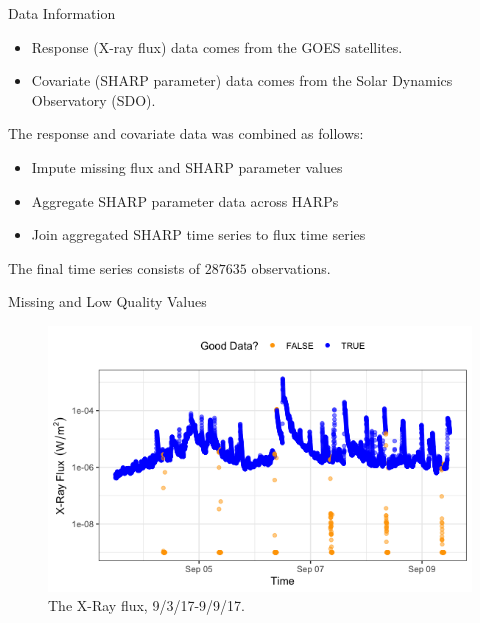\documentclass{beamer}
\begin{document}
\begin{frame}{Data Information}
    \begin{itemize}
        \item Response (X-ray flux) data comes from the GOES satellites.
        \item Covariate (SHARP parameter) data comes from the Solar Dynamics Observatory (SDO).
    \end{itemize}

    The response and covariate data was combined as follows:
    \begin{itemize}
        \item Impute missing flux and SHARP parameter values
        \item Aggregate SHARP parameter data across HARPs 
        \item Join aggregated SHARP time series to flux time series
    \end{itemize}
    The final time series consists of $\num[group-separator={,}]{287635}$ observations.
\end{frame}

\begin{frame}{Missing and Low Quality Values}
    \begin{figure}
        \centering
        \includegraphics[scale=0.5]{flux_20170906.png}
        \caption{The X-Ray flux, 9/3/17-9/9/17.}
        \label{fig:flux_20170906}
    \end{figure}
\end{frame}
\end{document}
